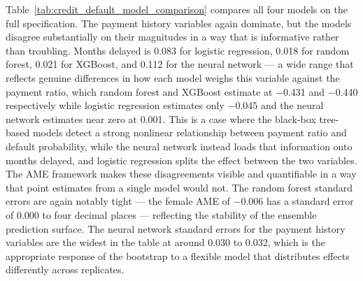 \documentclass[12pt]{article}
\begin{document}
	Table~\ref{tab:credit_default_model_comparison} compares all four models on the full specification. The payment history variables again dominate, but the models disagree substantially on their magnitudes in a way that is informative rather than troubling. Months delayed is 0.083 for logistic regression, 0.018 for random forest, 0.021 for XGBoost, and 0.112 for the neural network --- a wide range that reflects genuine differences in how each model weighs this variable against the payment ratio, which random forest and XGBoost estimate at $-$0.431 and $-$0.440 respectively while logistic regression estimates only $-$0.045 and the neural network estimates near zero at 0.001. This is a case where the black-box tree-based models detect a strong nonlinear relationship between payment ratio and default probability, while the neural network instead loads that information onto months delayed, and logistic regression splits the effect between the two variables. The AME framework makes these disagreements visible and quantifiable in a way that point estimates from a single model would not. The random forest standard errors are again notably tight --- the female AME of $-$0.006 has a standard error of 0.000 to four decimal places --- reflecting the stability of the ensemble prediction surface. The neural network standard errors for the payment history variables are the widest in the table at around 0.030 to 0.032, which is the appropriate response of the bootstrap to a flexible model that distributes effects differently across replicates.
	
\end{document}
